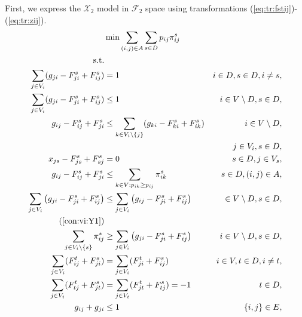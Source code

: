 First, we express the $\mathcal{X}_2$ model in $\mathcal{F}_2$ space using transformations (\ref{eq:tr:fstij})-(\ref{eq:tr:zij}). 
\begin{subequations}
\begin{flalign}
\label{objective:mfinpf2} &\makebox[0pt][l]{$\displaystyle{}\min \sum\limits_{(i,j) \in A} \sum\limits_{s \in D} p_{ij} \pi^s_{ij} $} & \\ 
\notag\text{s.t.}& & \\
\label{con:mfinpf2:arrowFromDest} \sum\limits_{j\in V_i}(g_{ji}-F^s_{ji}+F^s_{ij}) & = 1 & i\in D, s\in D, i \neq s,\\ 
\label{con:mfinpf2:arrowFromNonDestB} \sum\limits_{j \in V_i}(g_{ji}-F^s_{ji}+F^s_{ij}) &\leq 1 & i\in V \setminus D, s\in D,\\
\label{con:mfinpf2:arrowFromNonDestA} g_{ij}-F^s_{ij}+F^s_{ji}  & \leq \sum\limits_{k \in V_i\setminus\{j\}}(g_{ki}-F^s_{ki}+F^s_{ik}) & i\in V \setminus D,\\
\notag & & j\in V_i, s\in D,\\
\label{con:mfinpf2:startInSource} x_{js} - F^s_{js}+F^s_{sj} & = 0 & s\in D, j\in V_s,\\
\label{con:mfinpf2:yvar} g_{ij}-F^s_{ij}+F^s_{ji} & \leq \sum\limits_{k\in V:p_{ik}\geq p_{ij}}\pi^s_{ik} & s\in D, (i,j)\in A,\\ 
\label{con:mfinpf2:extraCon} \sum\limits_{j\in V_{i}}\left(g_{ji}-F^s_{ji}+F^s_{ij}\right) & \leq \sum\limits_{j\in V_{i}}\left(g_{ij}-F^s_{ji}+F^s_{ij}\right)  &\in V\setminus D, s\in D,\\
\notag\text(\ref{con:vi:Y1}) & &\\
\label{con:mfinpf2:sumYImpSumXTrans} \sum\limits_{j\in V_i\setminus\{s\} }\pi^{s}_{ij} & \geq \sum\limits_{j\in V_i} \left( g_{ji}-F^s_{ji}+F^s_{ij} \right) &  i\in V\setminus D, s\in D,\\ 
\label{con:mfinpf2:flowNormal}  \sum\limits_{\substack{ j\in V_i }}(F^t_{ij}+F^s_{ji})&=\sum\limits_{\substack{j\in V_i }}(F^t_{ji}+F^s_{ij}) & i\in V, t\in D, i \neq t,\\
\label{con:mfinpf2:flowDest}  \sum\limits_{\substack{j\in V_t}}(F^t_{tj}+F^s_{jt})&=\sum\limits_{\substack{j\in V_t}}(F^t_{jt}+F^s_{tj})  = -1  &  t \in D,\\
\label{con:mfinpf2:zbound} g_{ij}+g_{ji}&\leq 1 & \{i,j\}\in E, \\

\end{flalign}
\end{subequations}
